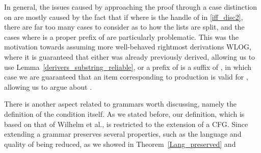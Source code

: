 \begin{isabellebody}
\begin{isamarkuptext}
In general, the issues caused by approaching the proof through a case distinction on \isa{{\isasymbeta}} are mostly
caused by the fact that if  where \isa{{\isasymdelta}} is
the handle of  in \eqref{iff_disc2}, there are far too many cases to consider
as to how the lists are split, and the cases where \isa{{\isasymgamma}\ {\isacharat}{\kern0pt}\ {\isasymdelta}} is a proper prefix of \isa{\isafree{{\isasymalpha}}\ {\isacharat}{\kern0pt}\ \isafree{{\isasymbeta}}} are 
particularly problematic. This was the motivation towards assuming more well-behaved rightmost 
derivations WLOG, where it is guaranteed that either \isa{\isafree{{\isasymalpha}}\ {\isacharat}{\kern0pt}\ \isafree{{\isasymbeta}}} was already previously derived, 
allowing us to use Lemma~\ref{derivers_substring_reliable}, or a prefix of \isa{{\isasymdelta}} is a suffix of \isa{{\isasymalpha}\ {\isacharat}{\kern0pt}\ {\isasymbeta}}, 
in which case we are guaranteed that an item corresponding to production  is valid 
for \isa{\isafree{{\isasymalpha}}\ {\isacharat}{\kern0pt}\ \isafree{{\isasymbeta}}}, allowing us to argue about .%
\end{isamarkuptext}\isamarkuptrue%
%
\isadelimdocument
%
\endisadelimdocument
%
\isatagdocument
%
\isamarkuptrue%
%
\endisatagdocument
{\isafolddocument}%
%
\isadelimdocument
%
\endisadelimdocument
%
\begin{isamarkuptext}%
There is another aspect related to  grammars worth discussing, namely the definition of the 
 condition itself. As we stated before, our definition, which is based on that of Wilhelm et 
al., is restricted to the extension of a CFG. Since extending a grammar preserves several properties, 
such as the language and quality of being reduced, as we showed in Theorem~\ref{Lang_preserved} and

\end{isamarkuptext}
\end{isabellebody}
